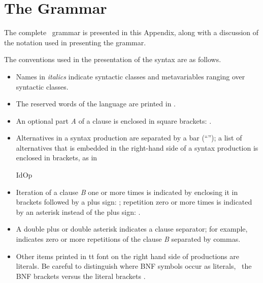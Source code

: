 \chapter{The Grammar}\label{grammar}

\def\htarget #1{#1}

The complete \pvs\ grammar is presented in this Appendix, along with a
discussion of the notation used in presenting the grammar.

The conventions used in the presentation of the syntax are as follows.

\begin{itemize}

\item Names in {\it italics\/} indicate syntactic classes and
metavariables ranging over syntactic classes.

\item The reserved words of the language are
      printed in .

\item An optional part {\it A\/} of a clause is enclosed in square brackets:
.

\item Alternatives in a syntax production are separated by a bar
(``\choice''); a list of alternatives that is embedded in the right-hand
side of a syntax production is enclosed in brackets, as in

\begin{bnf}
{IdOp }
\end{bnf}


\item Iteration of a clause {\it B\/} one or more times is indicated by
enclosing it in brackets followed by a plus sign: ;
repetition zero or more times is indicated by an asterisk instead of the
plus sign: .

\item A double plus or double asterisk indicates a clause separator; for
example,  indicates zero or more repetitions of the
clause {\it B} separated by commas.

\item Other items printed in tt font on the right hand side of
      productions are literals.  Be careful to distinguish where BNF
symbols occur as literals, \eg\ the BNF brackets \brc{} versus the
literal brackets \lit{\setb\sete}.

\end{itemize}

